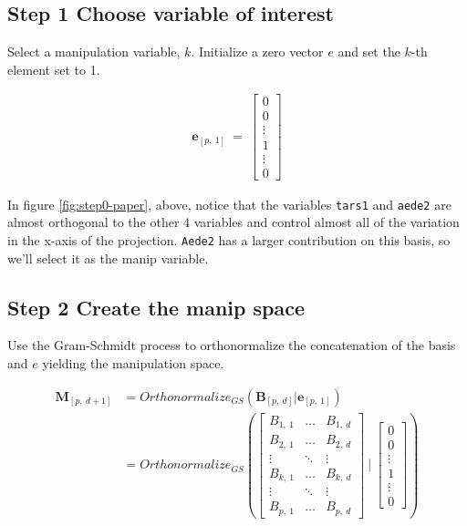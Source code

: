 \documentclass{monashthesis}
\begin{document}
\subsection{Step 1 Choose variable of
interest}\label{step-1-choose-variable-of-interest-1}

Select a manipulation variable, \(k\). Initialize a zero vector \(e\)
and set the \(k\)-th element set to 1.

\begin{align*}
\textbf{e}_{[p,~1]} ~=~
  \begin{bmatrix}
    0 \\
    0 \\
    \vdots \\
    1 \\
    \vdots \\
    0
  \end{bmatrix}
\end{align*}

In figure \ref{fig:step0-paper}, above, notice that the variables
\texttt{tars1} and \texttt{aede2} are almost orthogonal to the other 4
variables and control almost all of the variation in the x-axis of the
projection. \texttt{Aede2} has a larger contribution on this basis, so
we'll select it as the manip variable.

\subsection{Step 2 Create the manip
space}\label{step-2-create-the-manip-space-1}

Use the Gram-Schmidt process to orthonormalize the concatenation of the
basis and \(e\) yielding the manipulation space.

\begin{align*}
  \textbf{M}_{[p,~d+1]}
  &= Orthonormalize_{GS}( \textbf{B}_{[p,~d]}|\textbf{e}_{[p,~1]} ) \\
  &= Orthonormalize_{GS}
  \left(
    \begin{bmatrix}
      B_{1,~1} & \dots  & B_{1,~d} \\
      B_{2,~1} & \dots  & B_{2,~d} \\
      \vdots   & \ddots & \vdots   \\
      B_{k,~1} & \dots  & B_{k,~d} \\
      \vdots   & \ddots & \vdots   \\
      B_{p,~1} & \dots  & B_{p,~d}
    \end{bmatrix}
  ~|~
    \begin{bmatrix}
      0 \\
      0 \\
      \vdots \\
      1 \\
      \vdots \\
      0
    \end{bmatrix}
  \right)
\end{align*}
\end{document}
